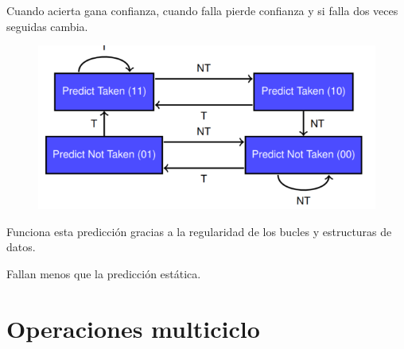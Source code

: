 \documentclass[12pt, twoside, openright]{report} %
\begin{document}
\begin{itemize}
\begin{itemize}
  Cuando acierta gana confianza, cuando falla pierde confianza y si falla dos veces seguidas cambia.
  \begin{figure}[H]
    {\includegraphics[scale=.4]{Untitled 9.png}}
  \end{figure}

  Funciona esta predicción gracias a la regularidad de los bucles y estructuras de datos.

  Fallan menos que la predicción estática.
\end{itemize}
    
\end{itemize}

\section{Operaciones multiciclo}
\end{document}
